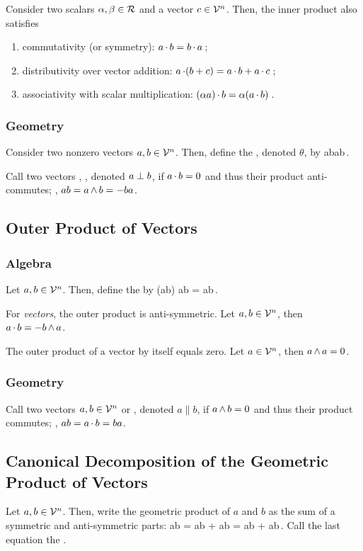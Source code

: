 Consider two scalars $\alpha, \beta\in\mathcal{R}$ and a vector $c\in\mathcal{V}^{n}$. Then, the inner product also satisfies
\begin{enumerate}
\item commutativity (or symmetry): $a\operatorname{\cdot} b = b\operatorname{\cdot} a$\,;
\item distributivity over vector addition: $a\operatorname{\cdot}(b + c) = a\operatorname{\cdot} b + a\operatorname{\cdot} c$\,;
\item associativity with scalar multiplication: $(\alpha a)\operatorname{\cdot} b = \alpha(a\operatorname{\cdot} b)$\,.
\end{enumerate}


\subsubsection{Geometry}
Consider two nonzero vectors $a,b\in\mathcal{V}^{n}$. Then, define the , denoted $\theta$, by
\beq
\magn a\magn b\cos\theta {} a\iprod b\,.
\eeq

Call two vectors , \aka {}, denoted $a\perp b$, if $a\operatorname{\cdot} b = 0$ and thus their product anti-commutes; \ie, $ab = a\operatorname{\wedge} b = -ba$.


\subsection{Outer Product of Vectors}

\subsubsection{Algebra}
Let $a, b\in\mathcal{V}^{n}$. Then, define the  by
\left(a\oprod b\right)  \com ab = \xcom ab\,.
\eeq

For \emph{vectors}, the outer product is anti-symmetric. Let $a,b\in\mathcal{V}^{n}$, then $a\operatorname{\cdot} b = -b\operatorname{\wedge} a$.

The outer product of a vector by itself equals zero. Let $a\in\mathcal{V}^{n}$, then $a\operatorname{\wedge} a = 0$.


\subsubsection{Geometry}
Call two vectors $a,b\in\mathcal{V}^{n}$  or , denoted $a\parallel b$, if $a\operatorname{\wedge} b = 0$ and thus their product commutes; \ie, $ab = a\operatorname{\cdot} b = ba$.


\subsection{Canonical Decomposition of the Geometric Product of Vectors}
Let $a, b\in\mathcal{V}^{n}$. Then, write the geometric product of $a$ and $b$ as the sum of a symmetric and anti-symmetric parts:
\beq
ab = \acom ab + \com ab = a\iprod b + a\oprod b\,.
\eeq
Call the last equation the .



